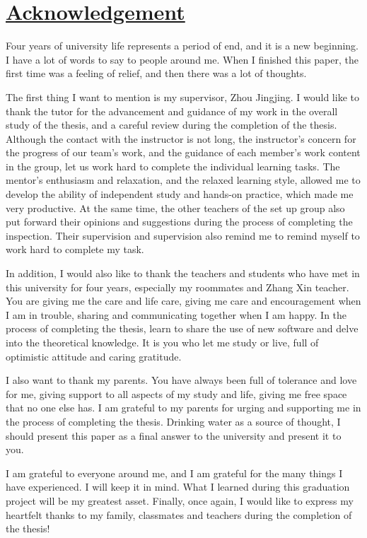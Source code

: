 \newpage
{}  %
\chapter*{\protect\hyperlink{:}{Acknowledgement}}
\thispagestyle{fancy} %

Four years of university life represents a period of end, and it is a new beginning. I have a lot of words to say to people around me. When I finished this paper, the first time was a feeling of relief, and then there was a lot of thoughts.

The first thing I want to mention is my supervisor, Zhou Jingjing. I would like to thank the tutor for the advancement and guidance of my work in the overall study of the thesis, and a careful review during the completion of the thesis. Although the contact with the instructor is not long, the instructor's concern for the progress of our team's work, and the guidance of each member's work content in the group, let us work hard to complete the individual learning tasks. The mentor's enthusiasm and relaxation, and the relaxed learning style, allowed me to develop the ability of independent study and hands-on practice, which made me very productive. At the same time, the other teachers of the set up group also put forward their opinions and suggestions during the process of completing the inspection. Their supervision and supervision also remind me to remind myself to work hard to complete my task.

In addition, I would also like to thank the teachers and students who have met in this university for four years, especially my roommates and Zhang Xin teacher. You are giving me the care and life care, giving me care and encouragement when I am in trouble, sharing and communicating together when I am happy. In the process of completing the thesis, learn to share the use of new software and delve into the theoretical knowledge. It is you who let me study or live, full of optimistic attitude and caring gratitude.

I also want to thank my parents. You have always been full of tolerance and love for me, giving support to all aspects of my study and life, giving me free space that no one else has. I am grateful to my parents for urging and supporting me in the process of completing the thesis. Drinking water as a source of thought, I should present this paper as a final answer to the university and present it to you.

I am grateful to everyone around me, and I am grateful for the many things I have experienced. I will keep it in mind. What I learned during this graduation project will be my greatest asset. Finally, once again, I would like to express my heartfelt thanks to my family, classmates and teachers during the completion of the thesis!
\clearpage
\null
\clearpage